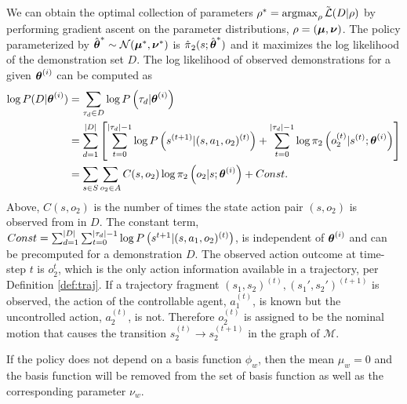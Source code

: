     We can obtain the optimal collection of parameters $\rho^*= \mathop{\mathrm{argmax}}_{\rho} \tilde{\mathcal{L}{}}(D|\rho)$ by
    performing gradient ascent on the parameter distributions, $\rho = (\boldsymbol{\mathbb{\mu}}, \boldsymbol{\mathbb{\nu}})$. The policy
    parameterized by $\hat{\boldsymbol{\mathbb{\theta}}}^* \sim \mathcal{N}(\boldsymbol{\mathbb{\mu}}^*, \boldsymbol{\mathbb{\nu}}^*)$ is
    $\hat{\pi_{}}_{2}(s; \hat{\boldsymbol{\mathbb{\theta}}}^*)$ and it maximizes the log likelihood of the
    demonstration set $D$. The log likelihood of observed demonstrations for a given $\boldsymbol{\mathbb{\theta}}^{(i)}$ can be computed
    as
    \begin{align*}
        \log P(D|\boldsymbol{\mathbb{\theta}}^{(i)}) & = \sum_{\tau_d \in D} \log P\left(\tau_d |\boldsymbol{\mathbb{\theta}}^{(i)}\right)\\
        & = \sum_{d=1}^{\lvert D\rvert} \left[ \sum_{t=0}^{\lvert\tau_d\rvert-1} \log P \left(s^{(t+1)}|(s, a_1, o_2)^{(t)}\right) +
            \sum_{t=0}^{\lvert\tau_d\rvert-1} \log \pi_{2}\left(o_2^{(t)}|s^{(t)}; \boldsymbol{\mathbb{\theta}}^{(i)}\right) \right]\\
        & = \sum_{s\in S}\sum_{o_2\in A} C(s, o_2) \log \pi_{2}\left(o_2|s; \boldsymbol{\mathbb{\theta}}^{(i)}\right) + Const.
    \end{align*}
    Above, $C(s, o_2)$ is the number of times the state action pair $(s,o_2)$ is observed from in $D$. The constant
    term, $Const =\sum_{d=1}^{\lvert D\rvert} \sum_{t=0}^{\lvert\tau_d\rvert-1} \log P\left(s^{t+1}|(s ,a_1,o_2)^{(t)}\right)$, is
    independent of $\boldsymbol{\mathbb{\theta}}^{(i)}$ and can be precomputed for a demonstration $D$. The observed action outcome at
    time-step $t$ is $o_2^t$, which is the only action information available in a trajectory, per Definition
    \ref{def:traj}. If a trajectory fragment $(s_1, s_2)^{(t)}, (s_1', s_2')^{(t+1)}$ is observed, the action of the
    controllable agent, $a_1^{(t)}$, is known but the uncontrolled action, $a_2^{(t)}$, is not. Therefore $o_2^{(t)}$ is
    assigned to be the nominal motion that causes the transition $s_2^{(t)} \rightarrow s_2^{(t+1)}$ in the graph of
    $\mathcal{M}$.

    \begin{remark}
        If the policy does not depend on a basis function $\phi_w$, then the mean $\mu_w=0$ and the basis function will
        be removed from the set of basis function as well as the corresponding parameter $\nu_w$.
    \end{remark}

